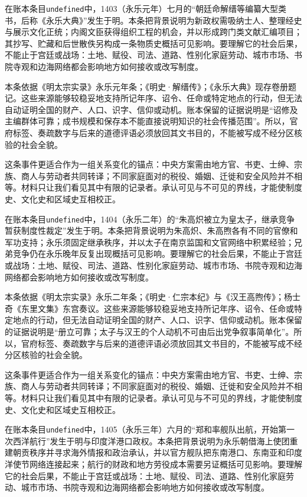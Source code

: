 在账本条目\texttt{undefined}中，1403（永乐元年）七月的“朝廷命解缙等编纂大型类书，后称《永乐大典》”发生于明。本条把背景说明为新政权需吸纳士人、整理经史与展示文化正统；内阁文臣获得组织工程的机会，并以形成跨门类文献汇编项目；其抄写、贮藏和后世散佚另构成一条物质史概括可见影响。要理解它的社会后果，不能止于宫廷或战场：土地、赋役、司法、道路、性别化家庭劳动、城市市场、书院寺观和边海网络都会影响地方如何接收或改写制度。

本条依据《明太宗实录》永乐元年条；《明史·解缙传》；《永乐大典》现存卷册题记。这些来源能够较稳妥地支持所记年序、诏令、任命或特定地点的行动，但无法自动证明全国的财产、人口、识字、信仰或动机。账本保留的证据说明是“诏修及主编群体可靠；成书规模和保存本不能直接说明知识的社会传播范围”。所以，官府标签、奏疏数字与后来的道德评语必须放回其文书目的，不能被写成不经分区核验的社会全貌。

这条事件更适合作为一组关系变化的锚点：中央方案需由地方官、书吏、士绅、宗族、商人与劳动者共同转译；不同家庭面对的税役、婚姻、迁徙和安全风险并不相等。材料只让我们看见其中有限的记录者。承认可见与不可见的界线，才能使制度史、文化史和区域史互相校正。

在账本条目\texttt{undefined}中，1404（永乐二年）的“朱高炽被立为皇太子，继承竞争暂获制度性裁定”发生于明。本条把背景说明为朱高炽、朱高煦各有不同的官僚和军功支持；永乐须固定继承秩序，并以太子在南京监国和文官网络中积累经验；兄弟竞争仍在永乐晚年反复出现概括可见影响。要理解它的社会后果，不能止于宫廷或战场：土地、赋役、司法、道路、性别化家庭劳动、城市市场、书院寺观和边海网络都会影响地方如何接收或改写制度。

本条依据《明太宗实录》永乐二年条；《明史·仁宗本纪》与《汉王高煦传》；杨士奇《东里文集》东宫奏议。这些来源能够较稳妥地支持所记年序、诏令、任命或特定地点的行动，但无法自动证明全国的财产、人口、识字、信仰或动机。账本保留的证据说明是“册立可靠；太子与汉王的个人动机不可由后出党争叙事简单化”。所以，官府标签、奏疏数字与后来的道德评语必须放回其文书目的，不能被写成不经分区核验的社会全貌。

这条事件更适合作为一组关系变化的锚点：中央方案需由地方官、书吏、士绅、宗族、商人与劳动者共同转译；不同家庭面对的税役、婚姻、迁徙和安全风险并不相等。材料只让我们看见其中有限的记录者。承认可见与不可见的界线，才能使制度史、文化史和区域史互相校正。

在账本条目\texttt{undefined}中，1405（永乐三年）六月的“郑和率舰队出航，开始第一次西洋航行”发生于明与印度洋港口政权。本条把背景说明为永乐朝借海上使团重建朝贡秩序并寻求海外情报和政治承认，并以官方舰队把东南港口、东南亚和印度洋使节网络连接起来；航行的财政和地方劳役成本需要另证概括可见影响。要理解它的社会后果，不能止于宫廷或战场：土地、赋役、司法、道路、性别化家庭劳动、城市市场、书院寺观和边海网络都会影响地方如何接收或改写制度。

